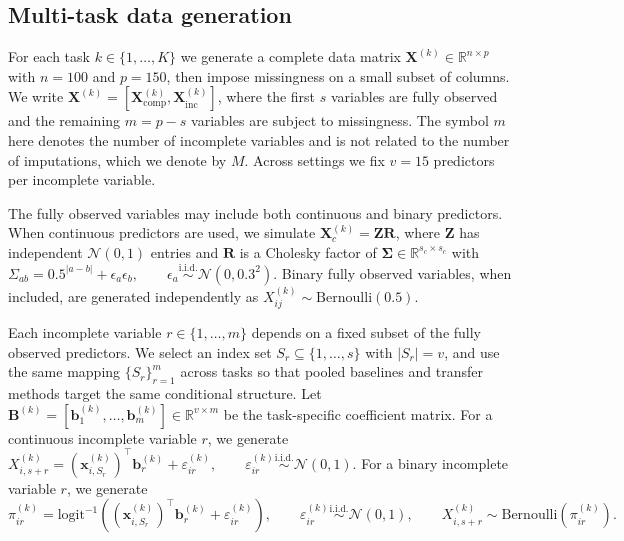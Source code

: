 \documentclass[12pt]{article}
\begin{document}
\subsection{Multi-task data generation}
For each task $k\in\{1,\dots,K\}$ we generate a complete data matrix $\bm{X}^{(k)}\in\mathbb{R}^{n\times p}$ with $n=100$ and $p=150$, then impose missingness on a small subset of columns. We write $\bm{X}^{(k)}=[\bm{X}^{(k)}_{\mathrm{comp}},\bm{X}^{(k)}_{\mathrm{inc}}]$, where the first $s$ variables are fully observed and the remaining $m=p-s$ variables are subject to missingness. The symbol $m$ here denotes the number of incomplete variables and is not related to the number of imputations, which we denote by $M$. Across settings we fix $v=15$ predictors per incomplete variable.

The fully observed variables may include both continuous and binary predictors. When continuous predictors are used, we simulate $\bm{X}^{(k)}_{c}=\bm{Z}\bm{R}$, where $\bm{Z}$ has independent $\mathcal{N}(0,1)$ entries and $\bm{R}$ is a Cholesky factor of $\bm{\Sigma}\in\mathbb{R}^{s_c\times s_c}$ with
\(\Sigma_{ab}=0.5^{|a-b|}+\epsilon_a\epsilon_b,\qquad \epsilon_a\stackrel{\text{i.i.d.}}{\sim}\mathcal{N}(0,0.3^2).\)
Binary fully observed variables, when included, are generated independently as $X^{(k)}_{ij}\sim\mathrm{Bernoulli}(0.5)$.

Each incomplete variable $r\in\{1,\dots,m\}$ depends on a fixed subset of the fully observed predictors. We select an index set $S_r\subseteq\{1,\dots,s\}$ with $|S_r|=v$, and use the same mapping $\{S_r\}_{r=1}^m$ across tasks so that pooled baselines and transfer methods target the same conditional structure. Let $\bm{B}^{(k)}=[\bm{b}^{(k)}_1,\dots,\bm{b}^{(k)}_m]\in\mathbb{R}^{v\times m}$ be the task-specific coefficient matrix. For a continuous incomplete variable $r$, we generate
\(X^{(k)}_{i,s+r}=(\bm{x}^{(k)}_{i,S_r})^\top\bm{b}^{(k)}_r+\varepsilon^{(k)}_{ir},
\qquad \varepsilon^{(k)}_{ir}\stackrel{\text{i.i.d.}}{\sim}\mathcal{N}(0,1).\)
For a binary incomplete variable $r$, we generate
\(\pi^{(k)}_{ir}=\mathrm{logit}^{-1}\!\left((\bm{x}^{(k)}_{i,S_r})^\top\bm{b}^{(k)}_r+\varepsilon^{(k)}_{ir}\right),
\qquad \varepsilon^{(k)}_{ir}\stackrel{\text{i.i.d.}}{\sim}\mathcal{N}(0,1),
\qquad X^{(k)}_{i,s+r}\sim\mathrm{Bernoulli}(\pi^{(k)}_{ir}).\)
\end{document}
